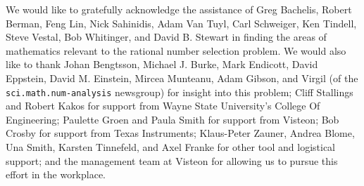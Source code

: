 \documentclass{esub2acm}
\begin{document}
\begin{acks}
We would like to gratefully acknowledge the assistance
of Greg Bachelis, Robert Berman, Feng
Lin, Nick Sahinidis, Adam Van Tuyl,
Carl Schweiger, Ken Tindell, Steve Vestal,
Bob Whitinger, and David B. Stewart
in finding the areas of
mathematics relevant to the rational number selection
problem.  We would also like to
thank Johan Bengtsson, Michael J. Burke,
Mark Endicott, David Eppstein,
David M. Einstein, Mircea Munteanu,
Adam Gibson, and Virgil (of the \texttt{sci.math.num-analysis} newsgroup)
for insight into this problem; Cliff Stallings and
Robert Kakos for support from Wayne State
University's College Of Engineering; Paulette Groen and
Paula Smith for support from Visteon; Bob Crosby for support
from Texas Instruments; Klaus-Peter Zauner, Andrea Blome,
Una Smith, Karsten Tinnefeld, and
Axel Franke for other tool
and logistical support; and the management
team at Visteon for allowing us to pursue this
effort in the workplace.
\end{acks}
\end{document}
